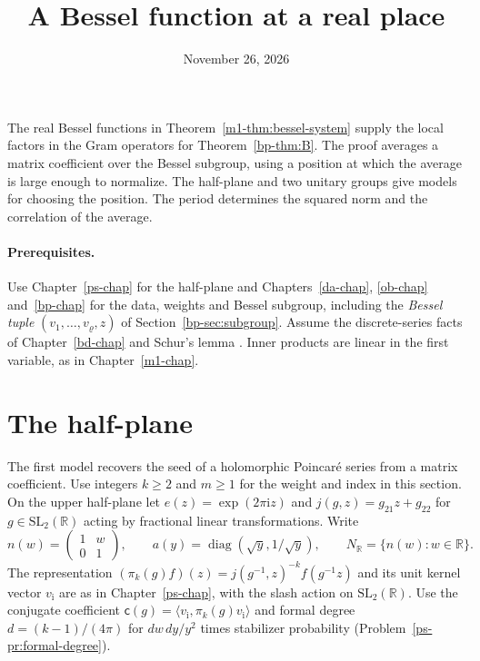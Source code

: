 \documentclass[reqno]{amsart}
\title{A Bessel function at a real place}
\author{}
\date{November 26, 2026}
\newcounter{chap}
\theoremstyle{definition}
\theoremstyle{plain}
\theoremstyle{remark}
\newcommand{\R}{\mathbb R}
\newcommand{\ii}{\mathrm i}
\newcommand{\cf}{\mathsf c}
\newcommand{\diag}{\operatorname{diag}}
\begin{document}
\maketitle
{}\label{chap}

The real Bessel functions in Theorem~\ref{m1-thm:bessel-system} supply the local factors in the Gram operators for Theorem~\ref{bp-thm:B}.  The proof averages a matrix coefficient over the Bessel subgroup, using a position at which the average is large enough to normalize.  The half-plane and two unitary groups give models for choosing the position.  The period determines the squared norm and the correlation of the average.

\paragraph{Prerequisites.}
Use Chapter~\ref{ps-chap} for the half-plane and Chapters~\ref{da-chap}, \ref{ob-chap} and~\ref{bp-chap} for the data, weights and Bessel subgroup, including the \emph{Bessel tuple} \((v_1,\dots,v_\varrho,z)\) of Section~\ref{bp-sec:subgroup}.  Assume the discrete-series facts of Chapter~\ref{bd-chap} and Schur's lemma \cite{Se}.  Inner products are linear in the first variable, as in Chapter~\ref{m1-chap}.

\section{The half-plane}\label{sec:half-plane}

The first model recovers the seed of a holomorphic Poincar\'e series from a matrix coefficient.  Use integers \(k\ge2\) and \(m\ge1\) for the weight and index in this section.  On the upper half-plane let \(e(z)=\exp(2\pi\ii z)\) and \(j(g,z)=g_{21}z+g_{22}\) for \(g\in\mathrm{SL}_2(\R)\) acting by fractional linear transformations.  Write
\[
 n(w)=\begin{pmatrix}1&w\\0&1\end{pmatrix},\qquad
 a(y)=\diag(\sqrt y,1/\sqrt y),\qquad
 N_{\R}=\{n(w):w\in\R\}.
\]
The representation \((\pi_k(g)f)(z)=j(g^{-1},z)^{-k}f(g^{-1}z)\) and its unit kernel vector \(v_{\ii}\) are as in Chapter~\ref{ps-chap}, with the slash action on \(\mathrm{SL}_2(\R)\).  Use the conjugate coefficient \(\cf(g)=\langle v_{\ii},\pi_k(g)v_{\ii}\rangle\) and formal degree \(d=(k-1)/(4\pi)\) for \(dw\,dy/y^2\) times stabilizer probability (Problem~\ref{ps-pr:formal-degree}).
\end{document}
